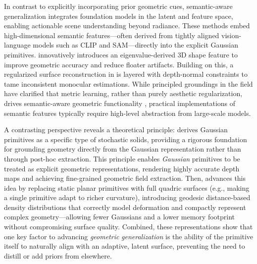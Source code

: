 \documentclass[11pt,a4paper]{article}
\begin{document}
In contrast to explicitly incorporating prior geometric cues, semantic-aware generalization integrates foundation models in the latent and feature space, enabling actionable scene understanding beyond radiance. These methods embed high-dimensional semantic features---often derived from tightly aligned vision-language models such as CLIP and SAM---directly into the explicit Gaussian primitives. \cite{arxiv:2501.17655v1} innovatively introduces an eigenvalue-derived 3D shape feature to improve geometric accuracy and reduce floater artifacts. Building on this, a regularized surface reconstruction in \cite{arxiv:2402.07466v1} is layered with depth-normal constraints to tame inconsistent monocular estimations. While principled groundings in the field have clarified that metric learning, rather than purely aesthetic regularization, drives semantic-aware geometric functionality \cite{arxiv:2601.17835v2}, practical implementations of semantic features typically require high-level abstraction from large-scale models.

A contrasting perspective reveals a theoretical principle: \cite{arxiv:2601.17835v2} derives Gaussian primitives as a specific type of stochastic solids, providing a rigorous foundation for grounding geometry directly from the Gaussian representation rather than through post-hoc extraction. This principle enables \emph{Gaussian} primitives to be treated as explicit geometric representations, rendering highly accurate depth maps and achieving fine-grained geometric field extraction. Then, \cite{arxiv:2601.17835v2} advances this idea by replacing static planar primitives with full quadric surfaces (e.g., making a single primitive adapt to richer curvature), introducing geodesic distance-based density distributions that correctly model deformation and compactly represent complex geometry---allowing fewer Gaussians and a lower memory footprint without compromising surface quality. Combined, these representations show that one key factor to advancing \emph{geometric} \emph{generalization} is the ability of the primitive itself to naturally align with an adaptive, latent surface, preventing the need to distill or add priors from elsewhere.
\end{document}
